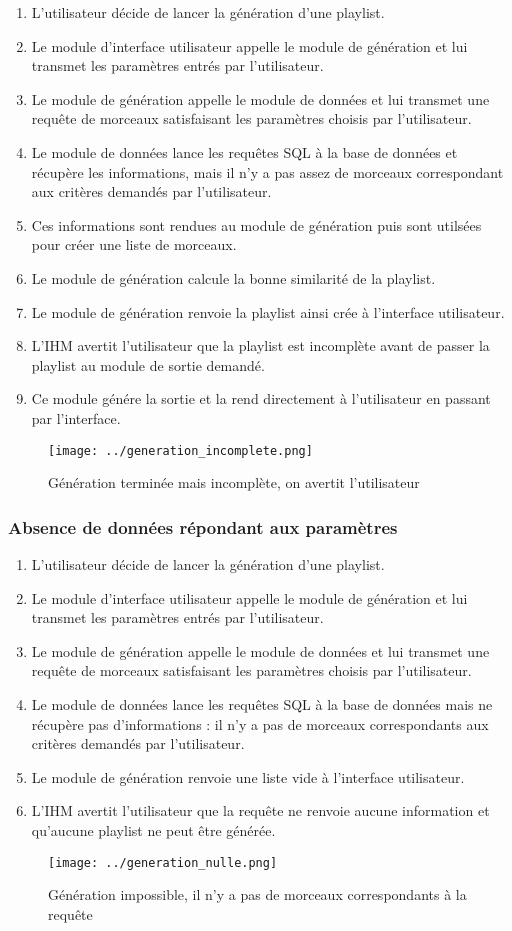 \begin{enumerate}
\item L'utilisateur décide de lancer la génération d'une playlist.
\item Le module d'interface utilisateur appelle le module de génération et 
lui transmet les paramètres entrés par l'utilisateur.
\item Le module de génération appelle le module de données et lui transmet 
une requête de morceaux satisfaisant les paramètres choisis par l'utilisateur.
\item Le module de données lance les requêtes SQL à la base de données et
récupère les informations, mais il n'y a pas assez de morceaux correspondant 
aux critères demandés par l'utilisateur.
\item Ces informations sont rendues au module de génération puis sont 
utilsées pour créer une liste de morceaux.
\item Le module de génération calcule la bonne similarité de la playlist.
\item Le module de génération renvoie la playlist ainsi crée à l'interface 
utilisateur.
\item L'IHM avertit l'utilisateur que la playlist est incomplète avant de 
passer la playlist au module de sortie demandé.
\item Ce module génére la sortie et la rend directement à l'utilisateur en 
passant par l'interface.
\end{enumerate}

\begin{figure}[!h]
\texttt{[image: ../generation\_incomplete.png]}
\caption{Génération terminée mais incomplète, on avertit l'utilisateur}
\end{figure}
 

\subsubsection{Absence de données répondant aux paramètres}

\begin{enumerate}
\item L'utilisateur décide de lancer la génération d'une playlist.
\item Le module d'interface utilisateur appelle le module de génération et 
lui transmet les paramètres entrés par l'utilisateur.
\item Le module de génération appelle le module de données et lui transmet 
une requête de morceaux satisfaisant les paramètres choisis par l'utilisateur.
\item Le module de données lance les requêtes SQL à la base de données mais 
ne récupère pas d'informations : il n'y a pas de morceaux correspondants aux 
critères demandés par l'utilisateur.
\item Le module de génération renvoie une liste vide à l'interface 
utilisateur.
\item L'IHM avertit l'utilisateur que la requête ne renvoie aucune 
information et qu'aucune playlist ne peut être générée.
\end{enumerate}

\begin{figure}[!h]
\texttt{[image: ../generation\_nulle.png]}
\caption{Génération impossible, il n'y a pas de morceaux correspondants à la requête}
\end{figure}